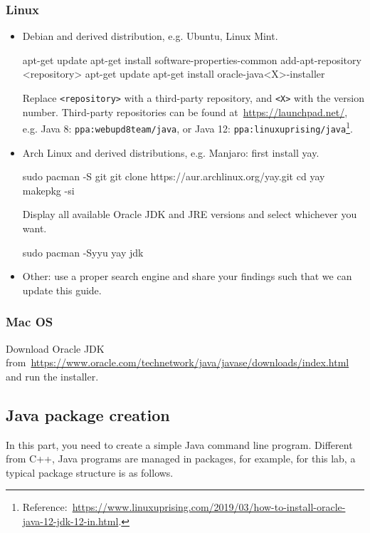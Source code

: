\documentclass[11pt,a4paper]{article}
\begin{document}
\subsubsection{Linux}
\begin{itemize}
	\item Debian and derived distribution, e.g. Ubuntu, Linux Mint.
\begin{shbox}
apt-get update
apt-get install software-properties-common
add-apt-repository <repository>
apt-get update
apt-get install oracle-java<X>-installer
\end{shbox}
Replace {\tt <repository>} with a third-party repository, and {\tt <X>} with the version number.  Third-party repositories can be found at~\url{https://launchpad.net/}, e.g. Java 8: {\tt ppa:webupd8team/java}, or Java 12: {\tt ppa:linuxuprising/java}\footnote{Reference:~\url{https://www.linuxuprising.com/2019/03/how-to-install-oracle-java-12-jdk-12-in.html}.}.
   
	 \item Arch Linux and derived distributions, e.g. Manjaro: first install {yay}.
\begin{shbox}
sudo pacman -S git
git clone https://aur.archlinux.org/yay.git
cd yay
makepkg -si
\end{shbox}
    Display all available Oracle JDK and JRE versions and select whichever you want.
\begin{shbox}
sudo pacman -Syyu
yay jdk
\end{shbox}
		\item Other: use a proper search engine and share your findings such that we can update this guide. %
\end{itemize}

\subsubsection{Mac OS}
Download Oracle JDK from~\url{https://www.oracle.com/technetwork/java/javase/downloads/index.html} and run the installer.

\subsection{Java package creation}

In this part, you need to create a simple Java command line program. Different from C++, Java programs are managed in packages, for example, for this lab, a typical package structure is as follows.
\end{document}

